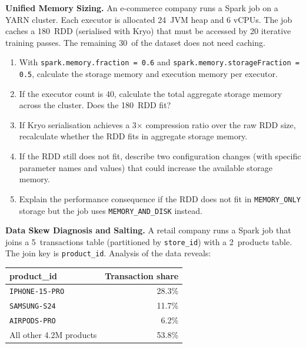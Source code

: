 \ap \textbf{Unified Memory Sizing.}
An e-commerce company runs a Spark job on a YARN cluster. Each executor
is allocated 24\GB\ JVM heap and 6 vCPUs. The job caches a 180\GB\ RDD
(serialised with Kryo) that must be accessed by 20 iterative training
passes. The remaining 30\GB\ of the dataset does not need caching.

\begin{enumerate}[label=(\alph*)]
  \item With \texttt{spark.memory.fraction = 0.6} and
        \texttt{spark.memory.storageFraction = 0.5}, calculate the
        storage memory and execution memory per executor.
  \item If the executor count is 40, calculate the total aggregate
        storage memory across the cluster. Does the 180\GB\ RDD fit?
  \item If Kryo serialisation achieves a 3$\times$ compression ratio
        over the raw RDD size, recalculate whether the RDD fits in
        aggregate storage memory.
  \item If the RDD still does not fit, describe two configuration
        changes (with specific parameter names and values) that could
        increase the available storage memory.
  \item Explain the performance consequence if the RDD does not fit
        in \texttt{MEMORY\_ONLY} storage but the job uses
        \texttt{MEMORY\_AND\_DISK} instead.
\end{enumerate}

\ap \textbf{Data Skew Diagnosis and Salting.}
A retail company runs a Spark job that joins a 5\TB\ transactions table
(partitioned by \texttt{store\_id}) with a 2\TB\ products table. The join
key is \texttt{product\_id}. Analysis of the data reveals:

\begin{center}
\begin{tabular}{lr}
\toprule
\textbf{product\_id} & \textbf{Transaction share} \\
\midrule
\texttt{IPHONE-15-PRO} & 28.3\% \\
\texttt{SAMSUNG-S24}   & 11.7\% \\
\texttt{AIRPODS-PRO}   & 6.2\% \\
All other 4.2M products & 53.8\% \\
\bottomrule
\end{tabular}
\end{center}

